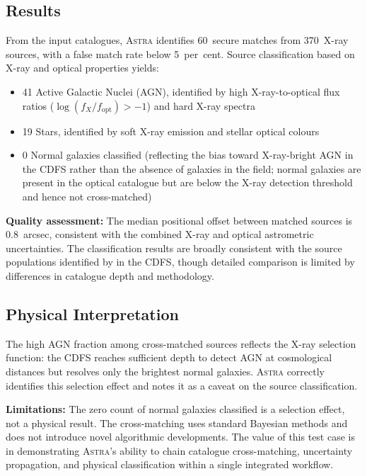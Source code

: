 \documentclass[fleqn,usenatbib]{mnras}
\newcommand{\astra}{\textsc{Astra}\xspace}
\begin{document}
\subsection{Results}
\label{sec:tc2:results}

From the input catalogues, \astra identifies 60~secure matches from 370~X-ray sources, with a false match rate below 5~per~cent.
Source classification based on X-ray and optical properties yields:
\begin{itemize}
  \item 41 Active Galactic Nuclei (AGN), identified by high X-ray-to-optical flux ratios ($\log(f_X/f_\mathrm{opt}) > -1$) and hard X-ray spectra
  \item 19 Stars, identified by soft X-ray emission and stellar optical colours
  \item 0 Normal galaxies classified (reflecting the bias toward X-ray-bright AGN in the CDFS rather than the absence of galaxies in the field; normal galaxies are present in the optical catalogue but are below the X-ray detection threshold and hence not cross-matched)
\end{itemize}

\textbf{Quality assessment:}
The median positional offset between matched sources is 0.8~arcsec, consistent with the combined X-ray and optical astrometric uncertainties.
The classification results are broadly consistent with the source populations identified by \citet{Bauer2004} in the CDFS, though detailed comparison is limited by differences in catalogue depth and methodology.

\subsection{Physical Interpretation}
\label{sec:tc2:interpretation}

The high AGN fraction among cross-matched sources reflects the X-ray selection function: the CDFS reaches sufficient depth to detect AGN at cosmological distances but resolves only the brightest normal galaxies.
\astra correctly identifies this selection effect and notes it as a caveat on the source classification.

\textbf{Limitations:} The zero count of normal galaxies classified is a selection effect, not a physical result.
The cross-matching uses standard Bayesian methods and does not introduce novel algorithmic developments.
The value of this test case is in demonstrating \astra's ability to chain catalogue cross-matching, uncertainty propagation, and physical classification within a single integrated workflow.
\end{document}

